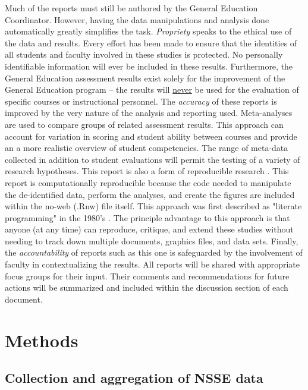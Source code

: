 \documentclass[fleqn,10pt]{SelfArx}\usepackage[]{graphicx}\usepackage[]{color}
\begin{document}
Much of the reports must still be authored by the General Education Coordinator. However, having the data manipulations and analysis done automatically greatly simplifies the task. \textit{Propriety} speaks to the ethical use of the data and results. Every effort has been made to ensure that the identities of all students and faculty involved in these studies is protected. No personally identifiable information will ever be included in these results. Furthermore, the General Education assessment results exist solely for the improvement of the General Education program -- the results will \underline{never} be used for the evaluation of specific courses or instructional personnel. The \textit{accuracy} of these reports is improved by the very nature of the analysis and reporting used. Meta-analyses \citep{Borenstein2011} are used to compare groups of related assessment results. This approach can account for variation in scoring and student ability between courses and provide an a more realistic overview of student competencies. The range of meta-data collected in addition to student evaluations will permit the testing of a variety of research hypotheses. This report is also a form of reproducible research \citep{Stodden2014}. This report is computationally reproducible because the code needed to manipulate the de-identified data, perform the analyses, and create the figures are included within the no-web (.Rnw) file itself. This approach was first described as "literate programming" in the 1980's \citep{Knuth1984}. The principle advantage to this approach is that anyone (at any time) can reproduce, critique, and extend these studies without needing to track down multiple documents, graphics files, and data sets. Finally, the \textit{accountability} of reports such as this one is safeguarded by the involvement of faculty in contextualizing the results. All reports will be shared with appropriate focus groups for their input. Their comments and recommendations for future actions will be summarized and included within the discussion section of each document.

\section{Methods}

\subsection{Collection and aggregation of NSSE data}
\end{document}
